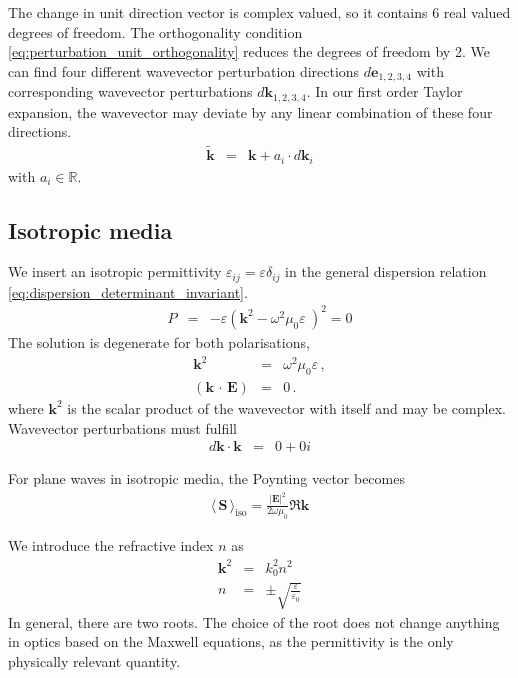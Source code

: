 \documentclass[12pt,a4paper,twoside,openright,BCOR10mm,headsepline,titlepage,abstracton,chapterprefix,final]{scrreprt}
\newcommand\Vector[1]{{\mathbf{#1}}}
\newcommand\vacuum{0}
\newcommand\wavenumber{k}
\newcommand\Wavevector{\Vector{\wavenumber}}
\newcommand{\scpm}[2]{(#1\,\cdot\,#2)}
\newcommand\scalarEfield{E}
\newcommand\Efield{\Vector{\scalarEfield}}
\newcommand\vacuumpermeability{\scalarpermeability_{\vacuum}}
\newcommand\scalarpermeability{\mu}
\newcommand\vacuumpermittivity{\scalarpermittivity_{\vacuum}}
\newcommand\scalarpermittivity{\varepsilon}
\newcommand{\timeavg}[1]{{\langle\,#1\,\rangle}}
\begin{document}
The change in unit direction vector is complex valued, so it contains 6 real valued degrees of freedom.
The orthogonality condition \eqref{eq:perturbation_unit_orthogonality} reduces the degrees of freedom by 2.
We can find four different wavevector perturbation directions $d\Vector{e}_{1,2,3,4}$
with corresponding wavevector perturbations $d \Wavevector_{1,2,3,4}$.
In our first order Taylor expansion, the wavevector may deviate by any linear combination of these four directions.
\begin{eqnarray}
 \tilde{\Wavevector} &=& \Wavevector + a_i \cdot d \Wavevector_i \label{eq:perturbed_wavevector}
\end{eqnarray}
with $a_i \in \mathbb{R}$.


\subsection{Isotropic media}
We insert an isotropic permittivity $\scalarpermittivity_{ij} = \scalarpermittivity \delta_{ij}$ 
in the general dispersion relation \eqref{eq:dispersion_determinant_invariant}.
\begin{eqnarray}
 P &=& -\scalarpermittivity 
       \left( 
         \Wavevector^2 - \omega^2 \vacuumpermeability \scalarpermittivity\
       \right)^2
    = 0
\end{eqnarray}
The solution is degenerate for both polarisations,
\begin{eqnarray}
 \Wavevector^2 &=& \omega^2 \vacuumpermeability \scalarpermittivity\,, \\
 \scpm{\Wavevector}{\Efield} &=& 0\,.
\end{eqnarray}
where $\Wavevector^2$ is the scalar product of the wavevector with itself and may be complex.
Wavevector perturbations must fulfill
\begin{eqnarray}
 d\Wavevector \cdot \Wavevector &=& 0 + 0i
\end{eqnarray}

For plane waves in isotropic media, the Poynting vector becomes 
\begin{eqnarray}
 \timeavg{\Vector{S}}_\text{iso} = \frac{ |\Efield|^2 }{ 2\omega\vacuumpermeability } \Re \Wavevector
\end{eqnarray}

We introduce the refractive index $n$ as
\begin{eqnarray}
 \Wavevector^2 &=& k_0^2 n^2 \\
 n &=& \pm \sqrt{ \frac{\scalarpermittivity}{\vacuumpermittivity} }
\end{eqnarray}
In general, there are two roots. 
The choice of the root does not change anything in optics based on the Maxwell equations, as the permittivity is the only physically relevant quantity.
\end{document}
